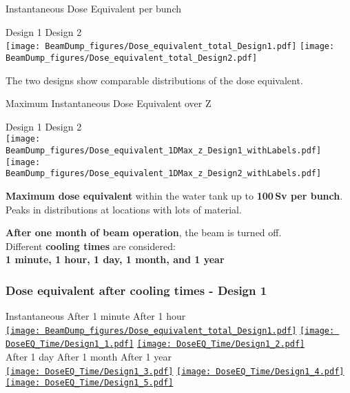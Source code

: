 \documentclass[xcolor={dvipsnames}]{beamer}
\begin{document}
\begin{frame}{Instantaneous Dose Equivalent per bunch}
\begin{center}
\hspace*{1.8cm} Design 1 \hfill Design 2 \hspace*{1.8cm} \\
  \texttt{[image: BeamDump\_figures/Dose\_equivalent\_total\_Design1.pdf]}
    \texttt{[image: BeamDump\_figures/Dose\_equivalent\_total\_Design2.pdf]}
\end{center}
The two designs show comparable distributions of the dose equivalent.
\end{frame}
\begin{frame}{Maximum Instantaneous Dose Equivalent over Z}
\begin{center}
\hspace*{2cm} Design 1 \hfill Design 2 \hspace*{1.8cm} \\
  \texttt{[image: BeamDump\_figures/Dose\_equivalent\_1DMax\_z\_Design1\_withLabels.pdf]}
    \texttt{[image: BeamDump\_figures/Dose\_equivalent\_1DMax\_z\_Design2\_withLabels.pdf]}
\end{center}
\textbf{Maximum dose equivalent} within the water tank up to \textbf{100\,Sv per bunch}. Peaks in distributions at locations with lots of material.
\end{frame}
\begin{frame}
\textbf{After one month of beam operation}, the beam is turned off.\\
Different \textbf{cooling times} are considered:\\
\textbf{1 minute, 1 hour, 1 day, 1 month, and 1 year}\\
  \frametitle{Dose equivalent after cooling times - \textbf{Design 1}}
  \hypertarget{coolingtimesprev_Design1}{}
  \begin{center}
    \hspace*{1cm} Instantaneous \hfill After 1 minute \hfill After 1 hour \hspace*{1.2cm} \\
  \hyperlink{Dose_equivalent_Design1}{\texttt{[image: BeamDump\_figures/Dose\_equivalent\_total\_Design1.pdf]}}
  \hyperlink{Dose_equivalent_minute_Design1}{\texttt{[image: DoseEQ\_Time/Design1\_1.pdf]}}
  \hyperlink{Dose_equivalent_hour_Design1}{\texttt{[image: DoseEQ\_Time/Design1\_2.pdf]}}\\
    \hspace*{1.2cm} After 1 day \hfill After 1 month \hfill After 1 year\hspace*{1.4cm} \\
  \hyperlink{Dose_equivalent_day_Design1}{\texttt{[image: DoseEQ\_Time/Design1\_3.pdf]}}
  \hyperlink{Dose_equivalent_month_Design1}{\texttt{[image: DoseEQ\_Time/Design1\_4.pdf]}}
  \hyperlink{Dose_equivalent_year_Design1}{\texttt{[image: DoseEQ\_Time/Design1\_5.pdf]}}
 \end{center}
\end{frame}
\end{document}
